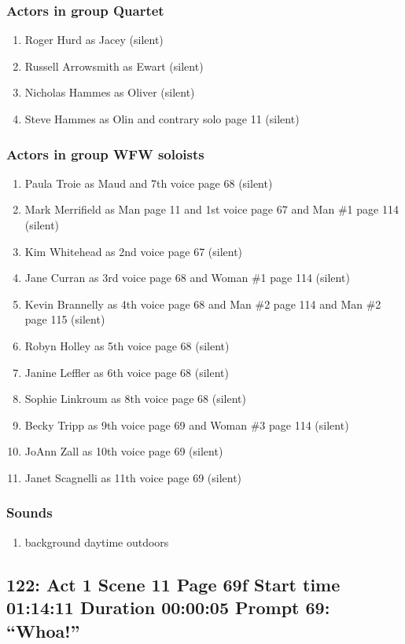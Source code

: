 \subsubsection{Actors in group Quartet}
\begin{enumerate}
\item Roger Hurd as Jacey (silent)
\item Russell Arrowsmith as Ewart (silent)
\item Nicholas Hammes as Oliver (silent)
\item Steve Hammes as Olin and contrary solo page 11 (silent)
\end{enumerate}
\subsubsection{Actors in group WFW soloists}
\begin{enumerate}
\item Paula Troie as Maud and 7th voice page 68 (silent)
\item Mark Merrifield as Man page 11 and 1st voice page 67 and Man \#1 page 114 (silent)
\item Kim Whitehead as 2nd voice page 67 (silent)
\item Jane Curran as 3rd voice page 68 and Woman \#1 page 114 (silent)
\item Kevin Brannelly as 4th voice page 68 and Man \#2 page 114 and Man \#2 page 115 (silent)
\item Robyn Holley as 5th voice page 68 (silent)
\item Janine Leffler as 6th voice page 68 (silent)
\item Sophie Linkroum as 8th voice page 68 (silent)
\item Becky Tripp as 9th voice page 69 and Woman \#3 page 114 (silent)
\item JoAnn Zall as 10th voice page 69 (silent)
\item Janet Scagnelli as 11th voice page 69 (silent)
\end{enumerate}

\subsubsection{Sounds}
\begin{enumerate}
\item background daytime outdoors
\end{enumerate}
\subsection{122: Act 1 Scene 11 Page 69f Start time 01:14:11 Duration 00:00:05 Prompt 69: ``Whoa!''}

